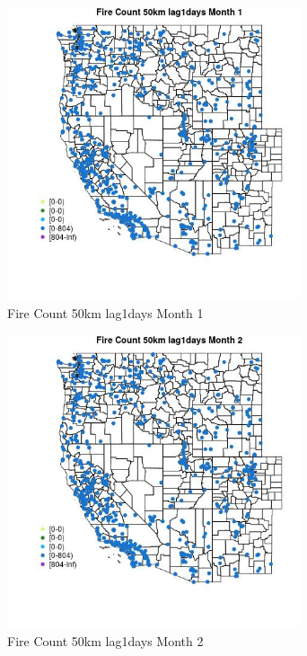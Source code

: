 \begin{figure} 
\centering  
\includegraphics[width=0.77\textwidth]{Code_Outputs/Report_ML_input_PM25_Step4_part_f_de_duplicated_aves_prioritize_24hr_obswNAs_MapObsMo1Fire_Count_50km_lag1days.jpg} 
\caption{\label{fig:Report_ML_input_PM25_Step4_part_f_de_duplicated_aves_prioritize_24hr_obswNAsMapObsMo1Fire_Count_50km_lag1days}Fire Count 50km lag1days Month 1} 
\end{figure} 
 

\begin{figure} 
\centering  
\includegraphics[width=0.77\textwidth]{Code_Outputs/Report_ML_input_PM25_Step4_part_f_de_duplicated_aves_prioritize_24hr_obswNAs_MapObsMo2Fire_Count_50km_lag1days.jpg} 
\caption{\label{fig:Report_ML_input_PM25_Step4_part_f_de_duplicated_aves_prioritize_24hr_obswNAsMapObsMo2Fire_Count_50km_lag1days}Fire Count 50km lag1days Month 2} 
\end{figure} 
 

